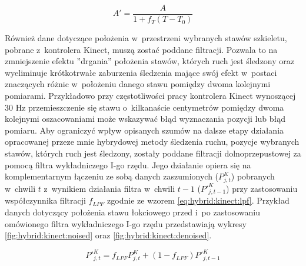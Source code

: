 \begin{equation}
	A' = \frac{A}{1+f_T (T-T_0)}
	\label{eq:hybrid:temperatureCorrection}
\end{equation}

Również dane dotyczące położenia w~przestrzeni wybranych stawów szkieletu, pobrane z~kontrolera Kinect, muszą zostać poddane filtracji. Pozwala to na zmniejszenie efektu ''drgania'' położenia stawów, których ruch jest śledzony oraz wyeliminuje krótkotrwałe zaburzenia śledzenia mające swój efekt w~postaci znaczących różnic w~położeniu danego stawu pomiędzy dwoma kolejnymi pomiarami. 
Przykładowo przy częstotliwości pracy kontrolera Kinect wynoszącej 30 Hz przemieszczenie się stawu o~kilkanaście centymetrów pomiędzy dwoma kolejnymi oszacowaniami może wskazywać błąd wyznaczania pozycji lub błąd pomiaru. 
Aby ograniczyć wpływ opisanych szumów na dalsze etapy działania opracowanej przeze mnie hybrydowej metody śledzenia ruchu, pozycje wybranych stawów, których ruch jest śledzony, zostały poddane filtracji dolnoprzepustowej za pomocą filtra wykładniczego I-go rzędu. Jego działanie opiera się na komplementarnym łączeniu ze sobą danych zaszumionych ($P^K_{j,t}$) pobranych w~chwili $t$ z~wynikiem działania filtra w~chwili $t-1$ ($P'^K_{j,t-1}$) przy zastosowaniu współczynnika filtracji $f_{LPF}$ zgodnie ze wzorem \ref{eq:hybrid:kinect:lpf}. Przykład danych dotyczący położenia stawu łokciowego przed i~po zastosowaniu omówionego filtra wykładniczego I-go rzędu przedstawiają wykresy \ref{fig:hybrid:kinect:noised} oraz \ref{fig:hybrid:kinect:denoised}.

\begin{equation}
	\label{eq:hybrid:kinect:lpf}
	P'^K_{j,t} = f_{LPF} P^K_{j,t} + (1-f_{LPF})P'^K_{j,t-1}
\end{equation}

